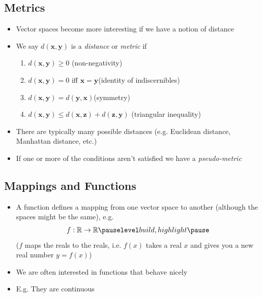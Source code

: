 \begin{slide}
\section[-1]{Metrics}

\begin{PauseHighLight}
  \begin{itemize}
  \item Vector spaces become more interesting if we have a notion of distance\pause
  \item We say $d(\bm{x}, \bm{y})$ is a \emph{distance} or \emph{metric} if
    \begin{enumerate}\squeeze
    \item $d(\bm{x}, \bm{y}) \geq 0$ \hfill (non-negativity)\pause
    \item $d(\bm{x}, \bm{y}) = 0$ iff $\bm{x} =\bm{y}$\hfill  (identity
      of indiscernibles)\pause
    \item $d(\bm{x}, \bm{y}) = d(\bm{y}, \bm{x})$\hfill (symmetry)\pause
    \item $d(\bm{x}, \bm{y}) \leq d(\bm{x}, \bm{z}) +d(\bm{z}, \bm{y})$
      \hfill(triangular inequality)\pause
    \end{enumerate}
  \item There are typically many possible distances (e.g. Euclidean
    distance, Manhattan distance, etc.)\pause
  \item If one or more of the conditions aren't satisfied we have a
    \emph{pseudo-metric}\pause
  \end{itemize}
\end{PauseHighLight}

\end{slide}


\begin{slide}
\section{Mappings and Functions}

\begin{PauseHighLight}
  \begin{itemize}
  \item A function defines a mapping from one vector space to another
    (although the spaces might be the same)\pause, e.g.
    \begin{align*}
      f: \mathbb{R} \rightarrow \mathbb{R}\pauseb
    \end{align*}
    ($f$ maps the reals to the reals, i.e. $f(x)$ takes a real $x$ and
    gives you a new real number $y=f(x)$)\pauseb
  \item We are often interested in functions that behave nicely\pauseb
  \item E.g. They are continuous\pauseb
  \end{itemize}
\end{PauseHighLight}

\end{slide}


